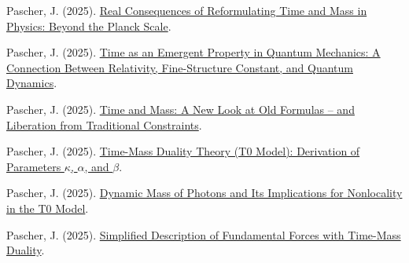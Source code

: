 \documentclass[12pt,a4paper]{article}
\begin{document}
\begin{thebibliography}{99}
		 Pascher, J. (2025). \href{https://github.com/jpascher/T0-Time-Mass-Duality/tree/main/2/pdf/English/JenseitsPlanckEn.pdf}{Real Consequences of Reformulating Time and Mass in Physics: Beyond the Planck Scale}.
		
		 Pascher, J. (2025). \href{https://github.com/jpascher/T0-Time-Mass-Duality/tree/main/2/pdf/English/ZeitEmergentQMEn.pdf}{Time as an Emergent Property in Quantum Mechanics: A Connection Between Relativity, Fine-Structure Constant, and Quantum Dynamics}.
		
		 Pascher, J. (2025). \href{https://github.com/jpascher/T0-Time-Mass-Duality/tree/main/2/pdf/English/ZeitMasseNeuerBlickEn.pdf}{Time and Mass: A New Look at Old Formulas – and Liberation from Traditional Constraints}.
		
		 Pascher, J. (2025). \href{https://github.com/jpascher/T0-Time-Mass-Duality/tree/main/2/pdf/English/ZeitMasseT0ParamsEn.pdf}{Time-Mass Duality Theory (T0 Model): Derivation of Parameters $\kappa$, $\alpha$, and $\beta$}.
		
		 Pascher, J. (2025). \href{https://github.com/jpascher/T0-Time-Mass-Duality/tree/main/2/pdf/English/DynMassePhotonenNichtlokalEn.pdf}{Dynamic Mass of Photons and Its Implications for Nonlocality in the T0 Model}.
		
		 Pascher, J. (2025). \href{https://github.com/jpascher/T0-Time-Mass-Duality/tree/main/2/pdf/English/VierKraefteZeitMasseEn.pdf}{Simplified Description of Fundamental Forces with Time-Mass Duality}.
	\end{thebibliography}
	
\end{document}
